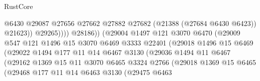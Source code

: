 \begin{lexlean}{RustCore}
\begin{coremodule}
                                            @6430
                                            @29087
                                            @27656
                                            @27662
                                            @27882
                                            @27682
                                            (@21388 (@27684 @6430 @6423))
                                            @21623))
                                        @29265))))
                                @28186))
                            (@29004
                              @1497
                              @121
                              @3070
                              @6470
                              (@29009
                                @547
                                @121
                                @1496
                                @15
                                @3070
                                @6469
                                @3333
                                @22401
                                (@29018
                                  @1496
                                  @15
                                  @6469
                                  (@29022
                                    @1494
                                    @177
                                    @11
                                    @14
                                    @6467
                                    @3130
                                    (@29036
                                      @1494
                                      @11
                                      @6467
                                      (@29162
                                        @1369
                                        @15
                                        @11
                                        @3070
                                        @6465
                                        @3324
                                        @2766
                                        (@29018
                                          @1369
                                          @15
                                          @6465
                                          (@29468
                                            @177
                                            @11
                                            @14
                                            @6463
                                            @3130
                                            (@29475
                                              @6463

\end{coremodule}
\end{lexlean}
